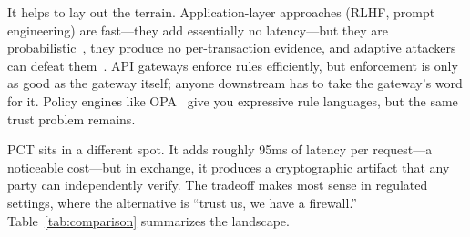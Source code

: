 \documentclass[10pt,conference]{IEEEtran}
\begin{document}
It helps to lay out the terrain. Application-layer approaches (RLHF, prompt engineering) are fast---they add essentially no latency---but they are probabilistic~\cite{sun2023trust}, they produce no per-transaction evidence, and adaptive attackers can defeat them~\cite{carlini2023extracting}. API gateways enforce rules efficiently, but enforcement is only as good as the gateway itself; anyone downstream has to take the gateway's word for it. Policy engines like OPA~\cite{schmidt2019opa} give you expressive rule languages, but the same trust problem remains.

PCT sits in a different spot. It adds roughly 95ms of latency per request---a noticeable cost---but in exchange, it produces a cryptographic artifact that any party can independently verify. The tradeoff makes most sense in regulated settings, where the alternative is ``trust us, we have a firewall.'' Table~\ref{tab:comparison} summarizes the landscape.

\begin{table}[t]
\centering
\caption{Comparison of AI Agent Governance Approaches}
\label{tab:comparison}
\end{table}
\end{document}
